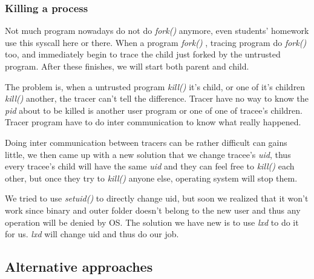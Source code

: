 \documentclass[conference,compsoc]{IEEEtran}
\begin{document}
		\subsubsection{Killing a process}
			\par 
				Not much program nowadays do not do \emph{ fork() } anymore, even students' homework use this syscall here or there. 
				When a program \emph{ fork() }, tracing program do \emph{ fork() } too, and immediately begin to trace the child just forked by the untrusted program. 
				After these finishes, we will start both parent and child.
			\par
				The problem is, when a untrusted program \emph{kill()} it's child, or one of it's children \emph{kill()} another, the tracer can't tell the difference. 
				Tracer have no way to know the \emph{pid} about to be killed is another user program or one of one of tracee's children. 
				Tracer program have to do inter communication to know what really happened.
			\par
				Doing inter communication between tracers can be rather difficult can gains little, we then came up with a new solution that we change tracee's \emph{uid}, thus every tracee's child will have the same \emph{uid} and they can feel free to \emph{kill()} each other, but once they try to \emph{kill()} anyone else, operating system will stop them.
			\par
				We tried to use \emph{setuid()} to directly change uid, but soon we realized that it won't work since binary and outer folder doesn't belong to the new user and thus any operation will be denied by OS. 
				The solution we have new is to use \emph{lxd} to do it for us. \emph{lxd} will change uid and thus do our job.
	\subsection {Alternative approaches}
\end{document}

